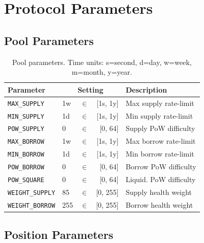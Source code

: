 \documentclass[10pt,a4paper,twocolumn]{article}
\theoremstyle{definition}
\theoremstyle{plain}
\theoremstyle{remark}
\begin{document}
\appendix

\section{Protocol Parameters}
\label{apx:parameters}

\subsection{Pool Parameters}

\begin{table}[H]
\centering
\caption{Pool parameters. Time units: s=second, d=day, w=week, m=month, y=year.}
\label{tab:pool-params}
\small
\begin{tabularx}{0.95\columnwidth}{@{}l l@{\,}c@{\,}r X@{}}
\toprule
Parameter & \multicolumn{3}{c}{Setting} & Description \\
\midrule
\texttt{MAX\_SUPPLY} & 1w & $\in$ & [1s, 1y] & Max supply rate-limit \\
\texttt{MIN\_SUPPLY} & 1d & $\in$ & [1s, 1y] & Min supply rate-limit \\
\texttt{POW\_SUPPLY} & 0 & $\in$ & [0, 64] & Supply PoW difficulty \\
\texttt{MAX\_BORROW} & 1w & $\in$ & [1s, 1y] & Max borrow rate-limit \\
\texttt{MIN\_BORROW} & 1d & $\in$ & [1s, 1y] & Min borrow rate-limit \\
\texttt{POW\_BORROW} & 0 & $\in$ & [0, 64] & Borrow PoW difficulty \\
\texttt{POW\_SQUARE} & 0 & $\in$ & [0, 64] & Liquid. PoW difficulty \\
\texttt{WEIGHT\_SUPPLY} & 85 & $\in$ & [0, 255] & Supply health weight \\
\texttt{WEIGHT\_BORROW} & 255 & $\in$ & [0, 255] & Borrow health weight \\
\bottomrule
\end{tabularx}
\end{table}

\subsection{Position Parameters}
\end{document}
